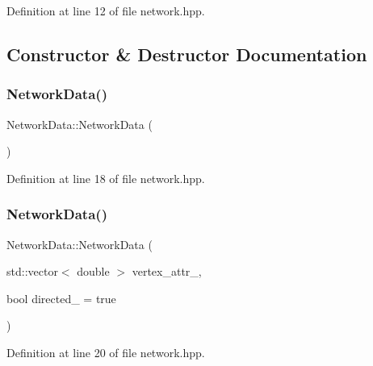 Definition at line 12 of file network.\+hpp.



\subsection{Constructor \& Destructor Documentation}
\mbox{\label{class_network_data_af62a7dde71c52bc49bc1e0ddc27b4724}} 
\subsubsection{\texorpdfstring{Network\+Data()}{NetworkData()}\hspace{0.1cm}{\footnotesize\ttfamily [1/3]}}
{\footnotesize\ttfamily Network\+Data\+::\+Network\+Data (\begin{DoxyParamCaption}{ }\end{DoxyParamCaption})\hspace{0.3cm}{\ttfamily [inline]}}



Definition at line 18 of file network.\+hpp.

\mbox{\label{class_network_data_a431d2c3a6cf9f61437643b767821e4a5}} 
\subsubsection{\texorpdfstring{Network\+Data()}{NetworkData()}\hspace{0.1cm}{\footnotesize\ttfamily [2/3]}}
{\footnotesize\ttfamily Network\+Data\+::\+Network\+Data (\begin{DoxyParamCaption}\item[{std\+::vector$<$ double $>$}]{vertex\+\_\+attr\+\_\+,  }\item[{bool}]{directed\+\_\+ = {\ttfamily true} }\end{DoxyParamCaption})\hspace{0.3cm}{\ttfamily [inline]}}



Definition at line 20 of file network.\+hpp.

\mbox{\label{class_network_data_ac4b5a740d40bc84695653c3e3499ac65}} 
